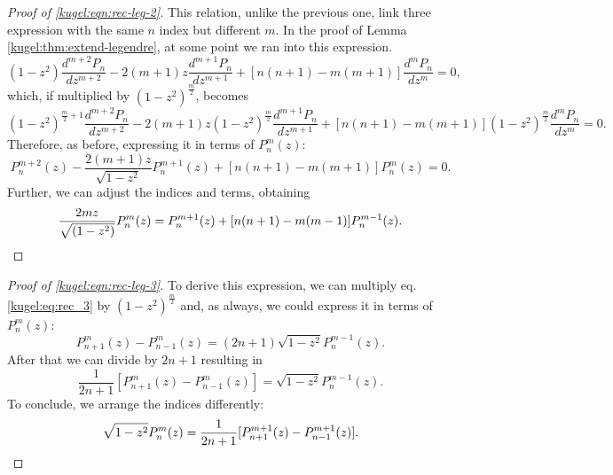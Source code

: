 \begin{proof}[Proof of \eqref{kugel:eqn:rec-leg-2}]
  This relation, unlike the previous one, link three expression with the same
  $n$ index but different $m$. In the proof of Lemma
  \ref{kugel:thm:extend-legendre}, at some point we ran into this expression.
  \begin{equation*}
    (1-z^2)\frac{d^{m+2}P_n}{dz^{m+2}}
    - 2(m+1)z \frac{d^{m+1}P_n}{dz^{m+1}}
    + [n(n+1)-m(m+1)]\frac{d^mP_n}{dz^m} = 0,
  \end{equation*}
  which, if multiplied by $(1-z^2)^{\frac{m}{2}}$, becomes
  \begin{equation*}
    (1-z^2)^{\frac{m}{2}+1}\frac{d^{m+2}P_n}{dz^{m+2}}
    - 2(m+1)z (1-z^2)^{\frac{m}{2}}\frac{d^{m+1}P_n}{dz^{m+1}}
    + [n(n+1)-m(m+1)](1-z^2)^{\frac{m}{2}}\frac{d^mP_n}{dz^m} = 0.
  \end{equation*}
  Therefore, as before, expressing it in terms of $P^m_n(z)$:
  \begin{equation*}
    P^{m+2}_n(z) - \frac{2(m+1)z}{\sqrt{1-z^2}}P^{m+1}_n(z)
    + [n(n+1)-m(m+1)]P^m_n(z)=0.
  \end{equation*}
  Further, we can adjust the indices and terms, obtaining
  \begin{equation*}
    \frac{2mz}{\sqrt{(1-z^2)}} P^m_n(z)
    = P^{m+1}_n(z) + [n(n+1)-m(m-1)] P^{m-1}_n(z).
    \qedhere
  \end{equation*}
\end{proof}

\begin{proof}[Proof of \eqref{kugel:eqn:rec-leg-3}]
  To derive this expression, we can multiply eq. \eqref{kugel:eq:rec_3} by
  $(1-z^2)^{\frac{m}{2}}$ and, as always, we could express it in terms of
  $P^m_n(z)$:
  \begin{equation*}
    P^m_{n+1}(z) - P^m_{n-1}(z) = (2n+1)\sqrt{1-z^2}P^{m-1}_n(z).
  \end{equation*}
  After that we can divide by $2n+1$ resulting in
  \begin{equation}\label{kugel:eq:helper}
    \frac{1}{2n+1}[P^m_{n+1}(z) - P^m_{n-1}(z)] = \sqrt{1-z^2}P^{m-1}_n(z).
  \end{equation}
  To conclude, we arrange the indices differently:
  \begin{equation*}
    \sqrt{1-z^2}P^{m}_n(z)=\frac{1}{2n+1}[P^{m+1}_{n+1}(z) - P^{m+1}_{n-1}(z)].
    \qedhere
  \end{equation*}
\end{proof}


